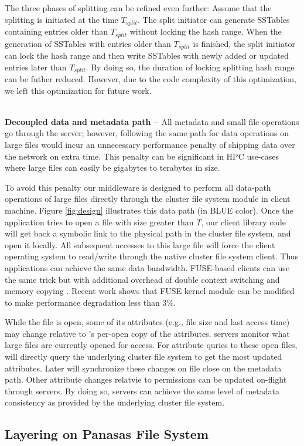 The three phases of splitting can be refined even further:
Assume that the splitting is initiated at the time $T_{split}$.
The split initiator can generate SSTables containing entries
older than $T_{split}$ without locking the hash range.
When the generation of SSTables with entries older than $T_{split}$ is finished,
the split initiator can lock the hash range and then write SSTables with
newly added or updated entries later than $T_{split}$.
By doing so, the duration of locking splitting hash range can be futher reduced.
However, due to the code complexity of this optimization,
we left this optimization for future work.

~\\
\textbf{Decoupled data and metadata path -- }
All metadata and small file operations go through the \giga server;
however, following the same path for data operations on large files
would incur an unnecessary performance penalty of shipping data over the network on extra time.
This penalty can be significant in HPC use-cases
where large files can easily be gigabytes to terabytes in size.

To avoid this penalty our middleware is designed to perform all
data-path operations of large files directly
through the cluster file system module in client machine.
Figure \ref{fig:design} illustrates this data path (in BLUE color).
Once the application tries to open a file with size greater than $T$,
our client library code will get back a symbolic link to the physical
path in the cluster file system, and open it locally.
All subsequent accesses to this large file will force
the client operating system to read/write through the native cluster file system client.
Thus applications can achieve the same data bandwidth.
FUSE-based clients can use the same trick but with additional overhead
of double context switching and memory copying \cite{PLFS}.
Recent work \cite{fuseopt} shows that FUSE kernel module can be modified
to make performance degradation less than $3\%$.


While the file is open, some of its attributes (e.g., file size and last access time)
may change relative to \tfs's per-open copy of the attributes.
\giga servers monitor what large files are currently opened for access.
For attribute quries to these open files, \giga will directly query the underlying
cluster file system to get the most updated attributes.
Later \giga will synchronize these changes on file close on the metadata path.
Other attribute changes relatvie to permissions can be updated on-flight
through \giga servers.
By doing so, \giga servers can achieve the same level of metadata consistency
as provided by the underlying cluster file system.


\subsection{Layering on Panasas File System}
\label{design.panfs}

